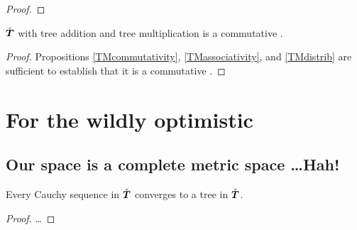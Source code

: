 \begin{proposition}
\begin{proof}

\end{proof}
\end{proposition}


\begin{corollary}\label{ItsARingHarry}
$\check{\boldsymbol{T}}$ with tree addition and tree multiplication is a commutative \rng.
\begin{proof}
  Propositions \ref{TMcommutativity}, \ref{TMassociativity}, and
  \ref{TMdistrib} are sufficient to establish that it is a commutative
  \rng.
\end{proof}
\end{corollary}

\section{For the wildly optimistic}
\subsection{Our space is a complete metric space \ldots Hah!}

\begin{proposition}\label{cauchyseq}
Every Cauchy sequence  in $\check{\boldsymbol{T}}$ converges to a tree in $\check{\boldsymbol{T}}$.
\begin{proof}
\ldots
\end{proof}
\end{proposition}














